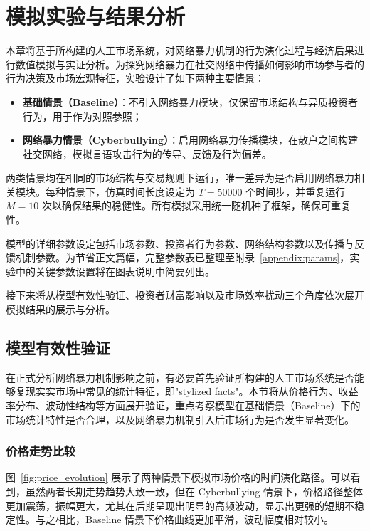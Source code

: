 \chapter{模拟实验与结果分析}
本章将基于所构建的人工市场系统，对网络暴力机制的行为演化过程与经济后果进行数值模拟与实证分析。为探究网络暴力在社交网络中传播如何影响市场参与者的行为决策及市场宏观特征，实验设计了如下两种主要情景：

\begin{itemize}
  \item \textbf{基础情景（Baseline）}：不引入网络暴力模块，仅保留市场结构与异质投资者行为，用于作为对照参照；
  \item \textbf{网络暴力情景（Cyberbullying）}：启用网络暴力传播模块，在散户之间构建社交网络，模拟言语攻击行为的传导、反馈及行为偏差。
\end{itemize}

两类情景均在相同的市场结构与交易规则下运行，唯一差异为是否启用网络暴力相关模块。每种情景下，仿真时间长度设定为 \( T = 50000 \) 个时间步，并重复运行 \( M = 10 \) 次以确保结果的稳健性。所有模拟采用统一随机种子框架，确保可重复性。

模型的详细参数设定包括市场参数、投资者行为参数、网络结构参数以及传播与反馈机制参数。为节省正文篇幅，完整参数表已整理至附录~\ref{appendix:params}，实验中的关键参数设置将在图表说明中简要列出。

接下来将从模型有效性验证、投资者财富影响以及市场效率扰动三个角度依次展开模拟结果的展示与分析。   


\section{模型有效性验证}

在正式分析网络暴力机制影响之前，有必要首先验证所构建的人工市场系统是否能够复现实实市场中常见的统计特征，即"stylized facts"。本节将从价格行为、收益率分布、波动性结构等方面展开验证，重点考察模型在基础情景（Baseline）下的市场统计特性是否合理，以及网络暴力机制引入后市场行为是否发生显著变化。

\subsection{价格走势比较}

图~\ref{fig:price_evolution} 展示了两种情景下模拟市场价格的时间演化路径。可以看到，虽然两者长期走势趋势大致一致，但在 Cyberbullying 情景下，价格路径整体更加震荡，振幅更大，尤其在后期呈现出明显的高频波动，显示出更强的短期不稳定性。与之相比，Baseline 情景下价格曲线更加平滑，波动幅度相对较小。

